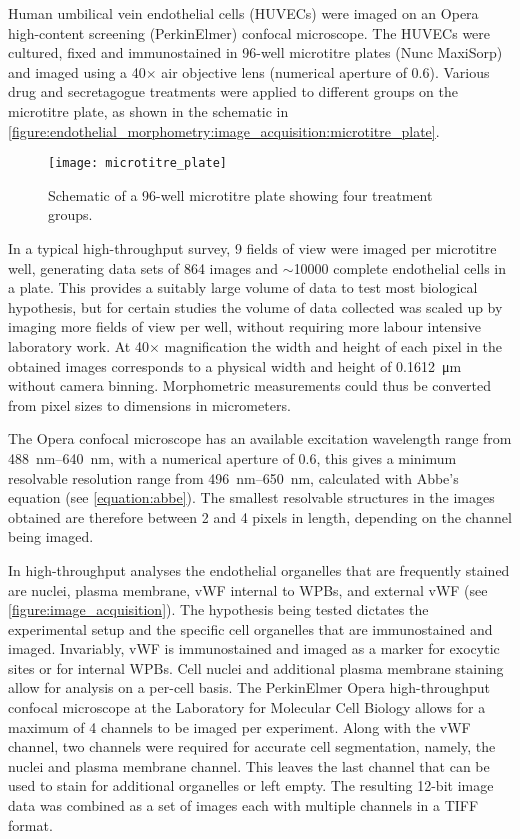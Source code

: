 Human umbilical vein endothelial cells (HUVECs) were imaged on an Opera high-content screening (PerkinElmer) confocal microscope. The HUVECs were cultured, fixed and immunostained in 96-well microtitre plates  (Nunc MaxiSorp) and imaged using a 40$\times$ air objective lens (numerical aperture of 0.6). Various drug and secretagogue treatments were applied to different groups on the microtitre plate, as shown in the schematic in \autoref{figure:endothelial_morphometry:image_acquisition:microtitre_plate}.

\begin{figure}[htbp!]
	\centering
	\texttt{[image: microtitre\_plate]}
	\caption[Microtitre plate layout]{Schematic of a 96-well microtitre plate showing four treatment groups.}
	\label{figure:endothelial_morphometry:image_acquisition:microtitre_plate}
\end{figure}

In a typical high-throughput survey, 9 fields of view were imaged per microtitre well, generating data sets of 864 images and $\sim$10000 complete endothelial cells in a plate. This provides a suitably large volume of data to test most biological hypothesis, but for certain studies the volume of data collected was scaled up by imaging more fields of view per well, without requiring more labour intensive laboratory work. At 40$\times$ magnification the width and height of each pixel in the obtained images corresponds to a physical width and height of \SI{0.1612}{\micro\meter} without camera binning. Morphometric measurements could thus be converted from pixel sizes to dimensions in micrometers.

The Opera confocal microscope has an available excitation wavelength range from \SIrange{488}{640}{\nano\meter}, with a numerical aperture of 0.6, this gives a minimum resolvable resolution range from \SIrange{496}{650}{\nano\meter}, calculated with Abbe's equation (see \autoref{equation:abbe}). The smallest resolvable structures in the images obtained are therefore between 2 and 4 pixels in length, depending on the channel being imaged.

In high-throughput analyses the endothelial organelles that are frequently stained are nuclei, plasma membrane, vWF internal to WPBs, and external vWF (see \autoref{figure:image_acquisition}). The hypothesis being tested dictates the experimental setup and the specific cell organelles that are immunostained and imaged. Invariably, vWF is immunostained and imaged as a marker for exocytic sites or for internal WPBs. Cell nuclei and additional plasma membrane staining allow for analysis on a per-cell basis. The PerkinElmer Opera high-throughput confocal microscope at the Laboratory for Molecular Cell Biology allows for a maximum of 4 channels to be imaged per experiment. Along with the vWF channel, two channels were required for accurate cell segmentation, namely, the nuclei and plasma membrane channel. This leaves the last channel that can be used to stain for additional organelles or left empty. The resulting 12-bit image data was combined as a set of images each with multiple channels in a TIFF format.


